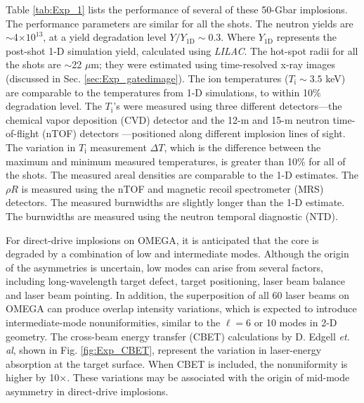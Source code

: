 \documentclass[aip,reprint]{revtex4-1}
\begin{document}
Table \ref{tab:Exp_1} lists the performance of several of these 50-Gbar implosions. The performance parameters are similar for all the shots. The neutron yields are $\sim$4$\times 10^{13}$, at a yield degradation level $Y/Y_\text{1D} \sim 0.3$. Where $Y_\text{1D}$ represents the post-shot 1-D simulation yield, calculated using \textit{LILAC}. The hot-spot radii for all the shots are $\sim$22 $\mu$m; they were estimated using time-resolved x-ray images\cite{Exp_Fred} (discussed in Sec. \ref{sec:Exp_gatedimage}). The ion temperatures ($T_\text{i}\sim 3.5$ keV) are comparable to the temperatures from 1-D simulations, to within 10$\%$ degradation level. The $T_\text{i}$'s were measured using three different detectors---the chemical vapor deposition (CVD) detector \cite{Exp_CVD} and the 12-m and 15-m neutron time-of-flight (nTOF) detectors \cite{Exp_NTOF1, Exp_NTOF2}---positioned along different implosion lines of sight. The variation in $T_\text{i}$ measurement $\Delta T$, which is the difference between the maximum and minimum measured temperatures, is greater than 10$\%$ for all of the shots. The measured areal densities are comparable to the 1-D estimates. The $\rho R$ is measured using the nTOF and magnetic recoil spectrometer (MRS) \cite{Exp_MRS} detectors. The measured burnwidths are slightly longer than the 1-D estimate. The burnwidths are measured using the neutron temporal diagnostic (NTD). \cite{Exp_NTD}
%
%
%

 For direct-drive implosions on OMEGA, it is anticipated that the core is degraded by a combination of low and intermediate modes. Although the origin of the asymmetries is uncertain, low modes can arise from several factors, including long-wavelength target defect, target positioning, laser beam balance and laser beam pointing.\cite{Exp_Hu, Exp_Goncharov, Exp_Igor} In addition, the superposition of all 60 laser beams on OMEGA can produce overlap intensity variations, which is expected to introduce intermediate-mode nonuniformities, similar to the $\ell=$6 or 10 modes in 2-D geometry. The cross-beam energy transfer (CBET) calculations by D. Edgell \textit{et. al},\cite{Exp_Edgell} shown in Fig. \ref{fig:Exp_CBET}, represent the variation in laser-energy absorption at the target surface. When CBET is included, the nonuniformity is higher by 10$\times$. These variations may be associated with the origin of mid-mode asymmetry in direct-drive implosions.
%
%
%
%
%
%
%
%
%
%
\end{document}
